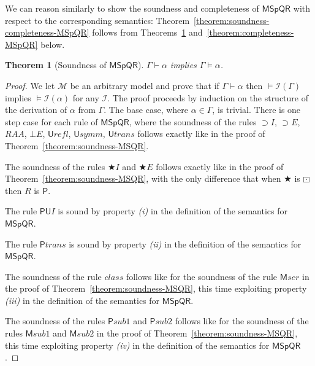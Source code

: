 \documentclass[times, 10pt]{article}
\newcommand{\varimp}{\supset}
\newcommand{\MSpQR}{\textsf{MSpQR}}
\newcommand{\Un}{\textsf{U}}
\newcommand{\Me}{\textsf{M}}
\newtheorem{theorem}{Theorem}
\newcommand{\RAA}{\mathit{RAA}}
\newcommand{\Unr}{\Un \mathit{refl}}
\newcommand{\Uns}{\Un \mathit{symm}}
\newcommand{\Unt}{\Un \mathit{trans}}
\renewcommand{\Un}{\mathsf{U}}
\renewcommand{\Me}{\mathsf{M}}
\newcommand{\PMe}{\mathsf{P}}
\newcommand{\class}{\mathit{class}}
\newcommand{\Meser}{\Me\mathit{ser}}
\newcommand{\PMetrans}{\PMe\mathit{trans}}
\newcommand{\Mesubone}{\Me\mathit{sub1}}
\newcommand{\Mesubtwo}{\Me\mathit{sub2}}
\newcommand{\PMesubone}{\PMe\mathit{sub1}}
\newcommand{\PMesubtwo}{\PMe\mathit{sub2}}
\newcommand{\I}{\mathscr{I}}
\begin{document}
We can reason similarly to show the soundness and completeness of $\MSpQR$ with respect to the corresponding semantics: 
Theorem~\ref{theorem:soundness-completeness-MSpQR} follows from Theorems~\ref{theorem:soundness-MSpQR}
and~\ref{theorem:completeness-MSpQR} below.

\begin{theorem}[Soundness of $\MSpQR$]\label{theorem:soundness-MSpQR}
$\Gamma \vdash \alpha$ implies $\Gamma \vDash \alpha$.
\end{theorem}

\begin{proof}
We let $\mathscr{M}$ be an arbitrary model and prove that if $\Gamma \vdash \alpha$ then 
$\vDash \I(\Gamma)$ implies  $\vDash \I(\alpha)$ for any $\I$.
The proof proceeds by induction on the structure of the derivation of $\alpha$ from $\Gamma$.  The base case, where $\alpha \in \Gamma $, is trivial.  There is one step case for each 
rule of $\MSpQR$, where the soundness of the rules $\varimp I$, $\varimp E$, $\RAA$, $\bot E$, 
$\Unr$, $\Uns$, $\Unt$ follows exactly like in the proof of Theorem~\ref{theorem:soundness-MSQR}.
 
The soundness of the rules $\bigstar I$ and $\bigstar E$ follows exactly like in the proof of 
Theorem~\ref{theorem:soundness-MSQR}, with the only difference that when $\bigstar$ is 
$\boxdot$ then $R$ is $\PMe$.

The rule $\PMe\Un I$ is sound by property \emph{(i)} in the definition of the semantics for $\MSpQR$.

The rule $\PMetrans$ is sound by property \emph{(ii)} in the definition of the semantics for $\MSpQR$.

The soundness of the rule  $\class$ follows like for the soundness
of the rule $\Meser$ in the proof of 
Theorem~\ref{theorem:soundness-MSQR}, this time exploiting property  \emph{(iii)} in the 
definition of the semantics for $\MSpQR$.

The soundness of the rules $\PMesubone$ and $\PMesubtwo$ follows like for the soundness
of the rules $\Mesubone$ and $\Mesubtwo$ in the proof of 
Theorem~\ref{theorem:soundness-MSQR}, this time exploiting property  \emph{(iv)} in the 
definition of the semantics for $\MSpQR$.
\end{proof}
\end{document}
